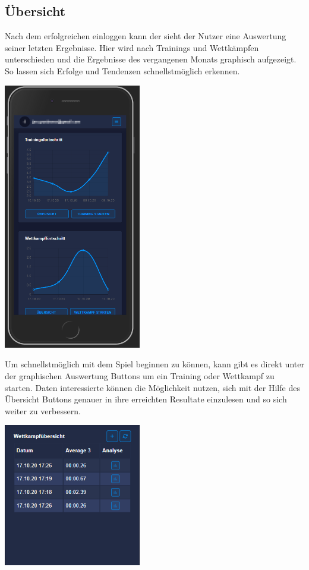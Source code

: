 \documentclass[a4paper]{article}
\theoremstyle{definition}
\begin{document}
	\subsection*{Übersicht}
	Nach dem erfolgreichen einloggen kann der sieht der Nutzer eine Auswertung seiner letzten Ergebnisse. Hier wird nach Trainings und Wettkämpfen unterschieden und die Ergebnisse des vergangenen Monats graphisch aufgezeigt. So lassen sich Erfolge und Tendenzen schnellstmöglich erkennen.
	\begin{center}
		\includegraphics[width= 6cm, keepaspectratio]{img/overview}
	\end{center} 
	Um schnellstmöglich mit dem Spiel beginnen zu können, kann gibt es direkt unter der graphischen Auswertung Buttons um ein Training oder Wettkampf zu starten. Daten interessierte können die Möglichkeit nutzen, sich mit der Hilfe des Übersicht Buttons genauer in ihre erreichten Resultate einzulesen und so sich weiter zu verbessern. 
	\begin{center}
		\includegraphics[width= 6cm, keepaspectratio]{img/competitionoverview}
	\end{center}
\end{document}

